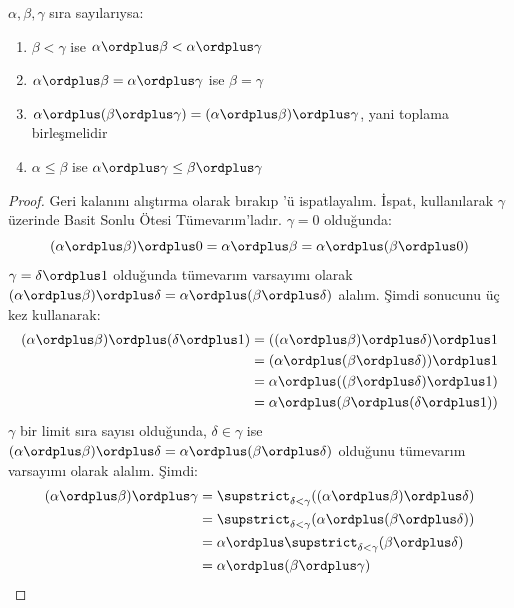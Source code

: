 \documentclass[../../../include/open-logic-section]{subfiles}
\begin{document}
\begin{lem}
$\alpha,\beta,\gamma$ sıra sayılarıysa:
\begin{enumerate}
	\item{} $\beta<\gamma$ ise
	$\alpha\ordplus\beta<\alpha\ordplus\gamma$
	\item{} $\alpha\ordplus\beta=
	\alpha\ordplus\gamma$ ise $\beta=\gamma$
	\item{} $\alpha\ordplus(\beta\ordplus\gamma)
	=(\alpha\ordplus\beta)\ordplus\gamma$, yani toplama birleşmelidir
	\item{} $\alpha\leq\beta$ ise
	$\alpha\ordplus\gamma\leq\beta\ordplus\gamma$
\end{enumerate}
\end{lem}

\begin{proof}
Geri kalanını alıştırma olarak bırakıp 'ü ispatlayalım.
İspat,  kullanılarak $\gamma$ üzerinde Basit
Sonlu Ötesi Tümevarım'ladır. $\gamma=0$ olduğunda:
\[
(\alpha\ordplus\beta)\ordplus0=\alpha\ordplus\beta
=\alpha\ordplus(\beta\ordplus0)
\]
$\gamma=\delta\ordplus1$ olduğunda tümevarım varsayımı olarak
$(\alpha\ordplus\beta)\ordplus\delta
=\alpha\ordplus(\beta\ordplus\delta)$ alalım. Şimdi
 sonucunu üç kez kullanarak:
\begin{align*}
	(\alpha \ordplus  \beta) \ordplus  (\delta \ordplus  1) & = ((\alpha \ordplus  \beta) \ordplus  \delta)\ordplus 1\\
	& = (\alpha \ordplus  (\beta \ordplus  \delta)) \ordplus  1\\
	& = \alpha \ordplus  ((\beta \ordplus  \delta)\ordplus 1)\\
	& = \alpha \ordplus  (\beta \ordplus  (\delta\ordplus 1))
\end{align*}
$\gamma$ bir limit sıra sayısı olduğunda, $\delta\in\gamma$ ise
$(\alpha\ordplus\beta)\ordplus\delta
=\alpha\ordplus(\beta\ordplus\delta)$ olduğunu tümevarım varsayımı olarak
alalım. Şimdi:
\begin{align*}
	(\alpha \ordplus  \beta) \ordplus  \gamma & = \supstrict_{\delta < \gamma}((\alpha \ordplus  \beta) \ordplus  \delta) \\
	&= \supstrict_{\delta < \gamma}(\alpha \ordplus  (\beta \ordplus  \delta))\\
	&= \alpha \ordplus  \supstrict_{\delta < \gamma}(\beta \ordplus  \delta)\\
	& = \alpha \ordplus  (\beta \ordplus  \gamma)
\end{align*}
\end{proof}
\end{document}
